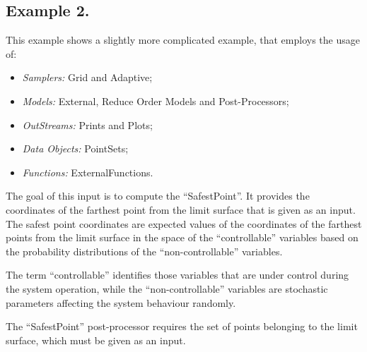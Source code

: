 \subsection{Example 2.}
\label{subsec:ex1}
This example shows a slightly more complicated example, that employs the usage of:
\begin{itemize}
    \item \textit{Samplers:} Grid and Adaptive;
    \item \textit{Models:} External, Reduce Order Models and Post-Processors;
    \item \textit{OutStreams:} Prints and Plots;
    \item \textit{Data Objects:} PointSets;
    \item \textit{Functions:} ExternalFunctions.
\end{itemize}
The goal of this input is to compute the ``SafestPoint''.
It provides the coordinates of the farthest
point from the limit surface that is given as an input.
%
The safest point coordinates are expected values of the coordinates of the
farthest points from the limit surface in the space of the ``controllable''
variables based on the probability distributions of the ``non-controllable''
variables.

The term ``controllable'' identifies those variables that are under control
during the system operation, while the ``non-controllable'' variables are
stochastic parameters affecting the system behaviour randomly.

The ``SafestPoint'' post-processor requires the set of points belonging to the
limit surface, which must be given as an input.

